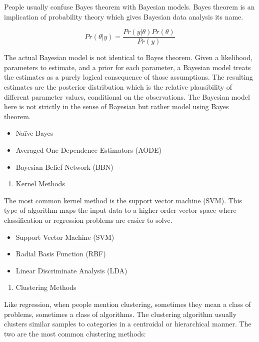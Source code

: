 \documentclass[12pt,]{krantz}
\providecommand{\tightlist}{%
  \setlength{\itemsep}{0pt}\setlength{\parskip}{0pt}}
\theoremstyle{definition}
\theoremstyle{definition}
\theoremstyle{remark}
\begin{document}
People usually confuse Bayes theorem with Bayesian models. Bayes theorem
is an implication of probability theory which gives Bayesian data
analysis its name.

\[Pr(\theta|y)=\frac{Pr(y|\theta)Pr(\theta)}{Pr(y)}\]

The actual Bayesian model is not identical to Bayes theorem. Given a
likelihood, parameters to estimate, and a prior for each parameter, a
Bayesian model treats the estimates as a purely logical consequence of
those assumptions. The resulting estimates are the posterior
distribution which is the relative plausibility of different parameter
values, conditional on the observations. The Bayesian model here is not
strictly in the sense of Bayesian but rather model using Bayes theorem.

\begin{itemize}
\tightlist
\item
  Naïve Bayes
\item
  Averaged One-Dependence Estimators (AODE)
\item
  Bayesian Belief Network (BBN)
\end{itemize}

\begin{enumerate}
\def\labelenumi{\arabic{enumi}.}
\setcounter{enumi}{6}
\tightlist
\item
  Kernel Methods
\end{enumerate}

The most common kernel method is the support vector machine (SVM). This
type of algorithm maps the input data to a higher order vector space
where classification or regression problems are easier to solve.

\begin{itemize}
\tightlist
\item
  Support Vector Machine (SVM)
\item
  Radial Basis Function (RBF)
\item
  Linear Discriminate Analysis (LDA)
\end{itemize}

\begin{enumerate}
\def\labelenumi{\arabic{enumi}.}
\setcounter{enumi}{7}
\tightlist
\item
  Clustering Methods
\end{enumerate}

Like regression, when people mention clustering, sometimes they mean a
class of problems, sometimes a class of algorithms. The clustering
algorithm usually clusters similar samples to categories in a centroidal
or hierarchical manner. The two are the most common clustering methods:
\end{document}
